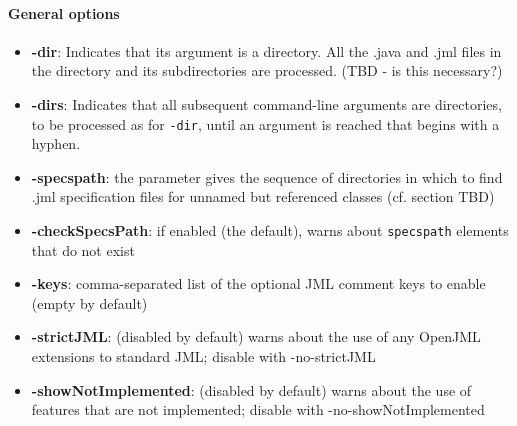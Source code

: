 \paragraph{General options}
\begin{itemize}[noitemsep,nolistsep]
\item \textbf{-dir}: Indicates that its argument is a directory. All the .java and .jml files in the directory and its subdirectories are processed. (TBD - is this necessary?)
\item \textbf{-dirs}: Indicates that all subsequent command-line arguments are directories, to be processed as for \texttt{-dir}, until an argument is reached that begins with a hyphen. 
\item \textbf{-specspath}: the parameter gives the sequence of directories in which to find .jml specification files for unnamed but referenced classes (cf. section TBD)
\item \textbf{-checkSpecsPath}: if enabled (the default), warns about \texttt{specspath} elements that do not exist
\item \textbf{-keys}: comma-separated list of the optional JML comment keys to enable (empty by default)
\item \textbf{-strictJML}: (disabled by default) warns about the use of any OpenJML extensions to standard JML; disable with -no-strictJML
\item \textbf{-showNotImplemented}: (disabled by default) warns about the use of features that are not implemented; disable with -no-showNotImplemented
\end{itemize}

